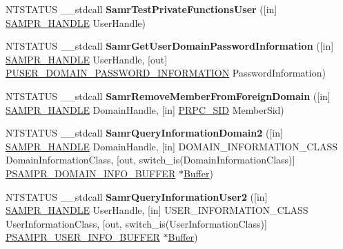 \begin{DoxyCompactItemize}
\mbox{\label{interfacesamr_a656c7976d4271d03ef0a70ef1c25a7c7}} 
N\+T\+S\+T\+A\+T\+US \+\_\+\+\_\+stdcall {\bfseries Samr\+Test\+Private\+Functions\+User} (\mbox{[}in\mbox{]} \hyperlink{interfacevoid}{S\+A\+M\+P\+R\+\_\+\+H\+A\+N\+D\+LE} User\+Handle)
\item 
\mbox{\label{interfacesamr_aa1e96e10c909be558958a049fa25d0f0}} 
N\+T\+S\+T\+A\+T\+US \+\_\+\+\_\+stdcall {\bfseries Samr\+Get\+User\+Domain\+Password\+Information} (\mbox{[}in\mbox{]} \hyperlink{interfacevoid}{S\+A\+M\+P\+R\+\_\+\+H\+A\+N\+D\+LE} User\+Handle, \mbox{[}out\mbox{]} \hyperlink{struct___u_s_e_r___d_o_m_a_i_n___p_a_s_s_w_o_r_d___i_n_f_o_r_m_a_t_i_o_n}{P\+U\+S\+E\+R\+\_\+\+D\+O\+M\+A\+I\+N\+\_\+\+P\+A\+S\+S\+W\+O\+R\+D\+\_\+\+I\+N\+F\+O\+R\+M\+A\+T\+I\+ON} Password\+Information)
\item 
\mbox{\label{interfacesamr_a3053637252b12cb17307aec6311cb32c}} 
N\+T\+S\+T\+A\+T\+US \+\_\+\+\_\+stdcall {\bfseries Samr\+Remove\+Member\+From\+Foreign\+Domain} (\mbox{[}in\mbox{]} \hyperlink{interfacevoid}{S\+A\+M\+P\+R\+\_\+\+H\+A\+N\+D\+LE} Domain\+Handle, \mbox{[}in\mbox{]} \hyperlink{struct___r_p_c___s_i_d}{P\+R\+P\+C\+\_\+\+S\+ID} Member\+Sid)
\item 
\mbox{\label{interfacesamr_a4c4f2764452bf384add31415cd31f87a}} 
N\+T\+S\+T\+A\+T\+US \+\_\+\+\_\+stdcall {\bfseries Samr\+Query\+Information\+Domain2} (\mbox{[}in\mbox{]} \hyperlink{interfacevoid}{S\+A\+M\+P\+R\+\_\+\+H\+A\+N\+D\+LE} Domain\+Handle, \mbox{[}in\mbox{]} D\+O\+M\+A\+I\+N\+\_\+\+I\+N\+F\+O\+R\+M\+A\+T\+I\+O\+N\+\_\+\+C\+L\+A\+SS Domain\+Information\+Class, \mbox{[}out, switch\+\_\+is(Domain\+Information\+Class)\mbox{]} \hyperlink{union___s_a_m_p_r___d_o_m_a_i_n___i_n_f_o___b_u_f_f_e_r}{P\+S\+A\+M\+P\+R\+\_\+\+D\+O\+M\+A\+I\+N\+\_\+\+I\+N\+F\+O\+\_\+\+B\+U\+F\+F\+ER} $\ast$\hyperlink{class_buffer}{Buffer})
\item 
\mbox{\label{interfacesamr_a4641ad74aafd5bfdb0726c5367f7759c}} 
N\+T\+S\+T\+A\+T\+US \+\_\+\+\_\+stdcall {\bfseries Samr\+Query\+Information\+User2} (\mbox{[}in\mbox{]} \hyperlink{interfacevoid}{S\+A\+M\+P\+R\+\_\+\+H\+A\+N\+D\+LE} User\+Handle, \mbox{[}in\mbox{]} U\+S\+E\+R\+\_\+\+I\+N\+F\+O\+R\+M\+A\+T\+I\+O\+N\+\_\+\+C\+L\+A\+SS User\+Information\+Class, \mbox{[}out, switch\+\_\+is(User\+Information\+Class)\mbox{]} \hyperlink{union___s_a_m_p_r___u_s_e_r___i_n_f_o___b_u_f_f_e_r}{P\+S\+A\+M\+P\+R\+\_\+\+U\+S\+E\+R\+\_\+\+I\+N\+F\+O\+\_\+\+B\+U\+F\+F\+ER} $\ast$\hyperlink{class_buffer}{Buffer})

\end{DoxyCompactItemize}
